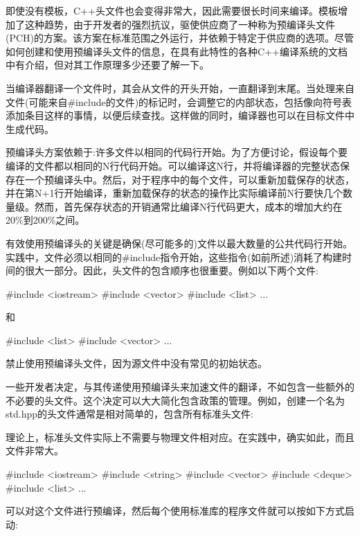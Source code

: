 
即使没有模板，C++头文件也会变得非常大，因此需要很长时间来编译。模板增加了这种趋势，由于开发者的强烈抗议，驱使供应商了一种称为预编译头文件(PCH)的方案。该方案在标准范围之外运行，并依赖于特定于供应商的选项。尽管如何创建和使用预编译头文件的信息，在具有此特性的各种C++编译系统的文档中有介绍，但对其工作原理多少还要了解一下。

当编译器翻译一个文件时，其会从文件的开头开始，一直翻译到末尾。当处理来自文件(可能来自\#include的文件)的标记时，会调整它的内部状态，包括像向符号表添加条目这样的事情，以便后续查找。这样做的同时，编译器也可以在目标文件中生成代码。

预编译头方案依赖于:许多文件以相同的代码行开始。为了方便讨论，假设每个要编译的文件都以相同的N行代码开始。可以编译这N行，并将编译器的完整状态保存在一个预编译头中。然后，对于程序中的每个文件，可以重新加载保存的状态，并在第N+1行开始编译，重新加载保存的状态的操作比实际编译前N行要快几个数量级。然而，首先保存状态的开销通常比编译N行代码更大，成本的增加大约在20\%到200\%之间。

有效使用预编译头的关键是确保(尽可能多的)文件以最大数量的公共代码行开始。实践中，文件必须以相同的\#include指令开始，这些指令(如前所述)消耗了构建时间的很大一部分。因此，头文件的包含顺序也很重要。例如以下两个文件:

\begin{cpp}
#include <iostream>
#include <vector>
#include <list>
...
\end{cpp}

和

\begin{cpp}
#include <list>
#include <vector>
...
\end{cpp}

禁止使用预编译头文件，因为源文件中没有常见的初始状态。

一些开发者决定，与其传递使用预编译头来加速文件的翻译，不如包含一些额外的不必要的头文件。这个决定可以大大简化包含政策的管理。例如，创建一个名为std.hpp的头文件通常是相对简单的，包含所有标准头文件:

\begin{notice}理论上，标准头文件实际上不需要与物理文件相对应。在实践中，确实如此，而且文件非常大。
\end{notice}

\begin{cpp}
#include <iostream>
#include <string>
#include <vector>
#include <deque>
#include <list>
...
\end{cpp}

可以对这个文件进行预编译，然后每个使用标准库的程序文件就可以按如下方式启动:

